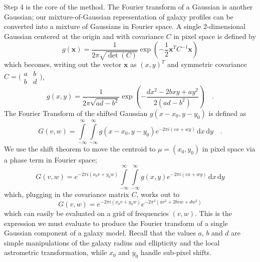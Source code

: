 \documentclass[11pt,preprint]{aastex}
\newcommand{\trick}{method}
\newcommand{\transpose}[1]{#1^{T}}
\begin{document}
Step 4 is the core of the \trick.  The Fourier transform of
a Gaussian is another Gaussian; our mixture-of-Gaussian representation
of galaxy profiles can be converted into a mixture of Gaussians in
Fourier space.
%
A single 2-dimensional Gaussian
centered at the origin and
with covariance $C$
in pixel space is defined by
\begin{equation}
g(\bm{x}) = \frac{1}{2 \pi \sqrt{\det(C)}}
\exp\left( -\frac{1}{2} \transpose{\bm{x}} C^{-1} \bm{x} \right)
\end{equation}
which becomes, writing out the vector $\bm{x}$ as $\transpose{(x,y)}$
and symmetric covariance $C = \bigl(\begin{smallmatrix}
a&b \\ b&d
\end{smallmatrix} \bigr)$,
\begin{equation}
g(x, y) = \frac{1}{2 \pi \sqrt{a d - b^2}}
\exp \left(
-\frac{d x^2 - 2 b x y + a y^2}{2(a d - b^2)}
\right) \quad .
\end{equation}
%
The Fourier Transform of the shifted Gaussian $g(x - x_0, y - y_0)$ is defined as
\begin{equation}
G(v,w) =
\int\limits_{-\infty}^{\infty}
\int\limits_{-\infty}^{\infty}
g(x - x_0, y - y_0) e^{-2 \pi i (v x + w y)} \, \mathrm{d}x \, \mathrm{d}y
\quad .
\end{equation}
We use the shift theorem to move the centroid to $\mu = (x_0, y_0)$
in pixel space via a phase term in Fourier space;
\begin{equation}
G(v, w) =
e^{-2 \pi i (x_0 v + y_0 w)}
\int\limits_{-\infty}^{\infty}
\int\limits_{-\infty}^{\infty}
g(x, y) e^{-2 \pi i (v x + w y)} \, \mathrm{d}x \, \mathrm{d}y
\end{equation}
%
which, plugging in the covariance matrix $C$, works out to
\begin{equation}
G(v,w) =
e^{-2 \pi i (x_0 v + y_0 w)}
e^{-2 \pi^2 (a v^2 + 2 b v w + d w^2)}
\label{eq:onegaussian}
\end{equation}
which can easily be evaluated on a grid of frequencies $(v, w)$.  This
is the expression we must evaluate to produce the Fourier transform of
a single Gaussian component of a galaxy model.  Recall that the values
$a$, $b$ and $d$ are simple manipulations of the galaxy radius and
ellipticity and the local astrometric transformation, while $x_0$ and
$y_0$ handle sub-pixel shifts.
\end{document}
